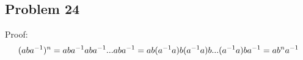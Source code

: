 \subsection*{Problem 24}
\noindent Proof:
\begin{equation} \notag
	(aba^{-1})^n = aba^{-1} aba^{-1} ... aba^{-1} = ab(a^{-1}a)b(a^{-1}a)b...(a^{-1}a)ba^{-1} = ab^na^{-1}
\end{equation}

